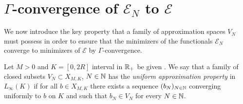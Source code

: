
\section{$\Gamma$-convergence of $\mathcal E_N$ to $\mathcal E$}


We now introduce the key property that a family of approximation spaces $V_N$ must possess in order to ensure that the minimizers of the functionals $\mathcal E_N$ converge to minimizers of $\mathcal E$ by $\Gamma$-convergence.

\begin{definition}\label{VNdef}
Let $M > 0$ and $K=[0,2R]$ interval in $\mathbb{R}_+$  be given . We say that a family of closed subsets $V_N \subset X_{M,K}$, $N \in \mathbb{N}$ has the \emph{uniform approximation property} in $L_{\infty}(K)$ if for all $b\in X_{M,K}$ there exists a sequence $(b_N)_{N \in \mathbb{N}}$ converging uniformly to $b$ on $K$ and such that $b_N\in V_N$ for every $N \in \mathbb{N}$.
\end{definition}



